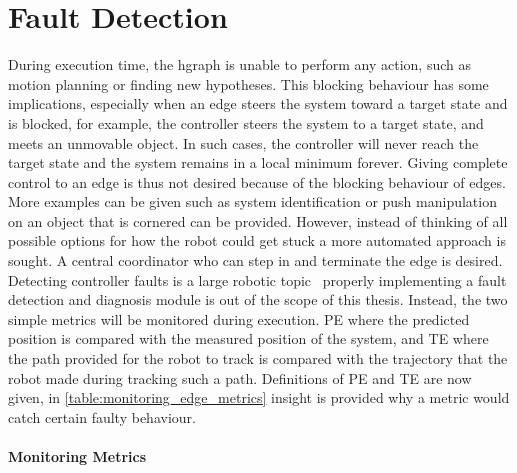\section{Fault Detection}%
\label{sec:fault_detection}
During execution time, the \ac{hgraph} is unable to perform any action, such as motion planning or finding new hypotheses. This blocking behaviour has some implications, especially when an edge steers the system toward a target state and is blocked, for example, the controller steers the system to a target state, and meets an unmovable object. In such cases, the controller will never reach the target state and the system remains in a local minimum forever. Giving complete control to an edge is thus not desired because of the blocking behaviour of edges. More examples can be given such as system identification or push manipulation on an object that is cornered can be provided. However, instead of thinking of all possible options for how the robot could get stuck a more automated approach is sought.  A central coordinator who can step in and terminate the edge is desired. Detecting controller faults is a large robotic topic~\cite{khalastchi_fault_2019} properly implementing a fault detection and diagnosis module is out of the scope of this thesis. Instead, the two simple metrics will be monitored during execution. \ac{PE} where the predicted position is compared with the measured position of the system, and \ac{TE} where the path provided for the robot to track is compared with the trajectory that the robot made during tracking such a path. Definitions of \ac{PE} and \ac{TE} are now given, in \cref{table:monitoring_edge_metrics} insight is provided why a metric would catch certain faulty behaviour.

\paragraph{Monitoring Metrics}

